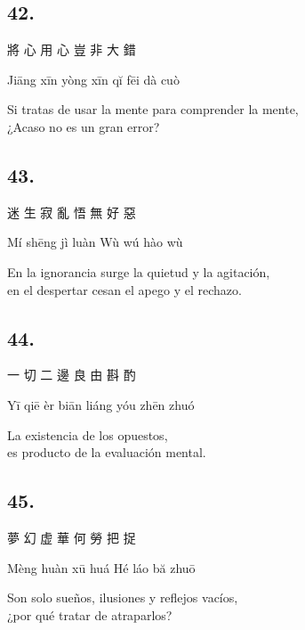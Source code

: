 \documentclass[
  a5paperpaper,
]{article}
\begin{document}
\begin{verseblock}

\hypertarget{section-116}{%
\subsection{42.}\label{section-116}}

將 心 用 心 豈 非 大 錯

Jiāng xīn yòng xīn qĭ fēi dà cuò

Si tratas de usar la mente para comprender la mente,\\
¿Acaso no es un gran error?

\end{verseblock}

\begin{verseblock}

\hypertarget{section-117}{%
\subsection{43.}\label{section-117}}

迷 生 寂 亂 悟 無 好 惡

Mí shēng jì luàn Wù wú hào wù

En la ignorancia surge la quietud y la agitación,\\
en el despertar cesan el apego y el rechazo.

\end{verseblock}

\begin{verseblock}

\hypertarget{section-118}{%
\subsection{44.}\label{section-118}}

一 切 二 邊 良 由 斟 酌

Yī qiē èr biān liáng yóu zhēn zhuó

La existencia de los opuestos,\\
es producto de la evaluación mental.

\end{verseblock}

\begin{verseblock}

\hypertarget{section-119}{%
\subsection{45.}\label{section-119}}

夢 幻 虚 華 何 勞 把 捉

Mèng huàn xū huá Hé láo bă zhuō

Son solo sueños, ilusiones y reflejos vacíos,\\
¿por qué tratar de atraparlos?

\end{verseblock}
\end{document}
